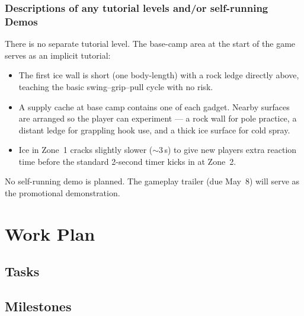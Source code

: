 \documentclass[12pt]{article}
\begin{document}
\subsubsection{Descriptions of any tutorial levels and/or self-running Demos}

There is no separate tutorial level. The base-camp area at the start of the game serves as an implicit tutorial:

\begin{itemize}[leftmargin=2em]
    \item The first ice wall is short (one body-length) with a rock ledge directly above, teaching the basic swing--grip--pull cycle with no risk.
    \item A supply cache at base camp contains one of each gadget. Nearby surfaces are arranged so the player can experiment --- a rock wall for pole practice, a distant ledge for grappling hook use, and a thick ice surface for cold spray.
    \item Ice in Zone~1 cracks slightly slower ($\sim$3\,s) to give new players extra reaction time before the standard 2-second timer kicks in at Zone~2.
\end{itemize}

No self-running demo is planned. The gameplay trailer (due May~8) will serve as the promotional demonstration.

\newpage

\section{Work Plan}

\subsection{Tasks}

\subsection{Milestones}
\end{document}
